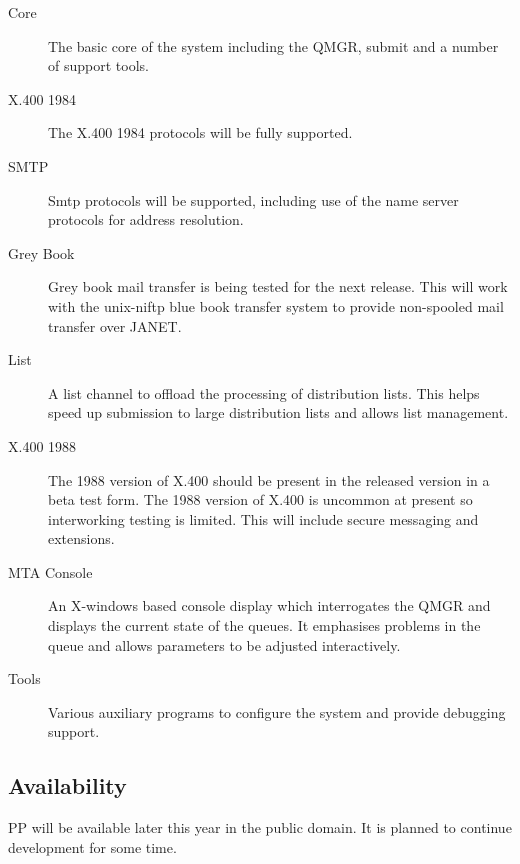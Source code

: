 \begin{description}
\item[Core]	The basic core of the system including the QMGR,
submit and a number of support tools.

\item[X.400 1984]	The X.400 1984 protocols will be fully supported.

\item[SMTP]	Smtp protocols will be supported, including use of the
name server protocols for address resolution.

\item[Grey Book] Grey book mail transfer is being tested for the next
release. This will work with the unix-niftp blue book transfer system
to provide non-spooled mail transfer over JANET.

\item[List]	A list channel to offload the processing of
distribution lists. This helps speed up submission to large
distribution lists and allows list management.

\item[X.400 1988]	The 1988 version of X.400 should be present in the
released version in a beta test form. The 1988 version of X.400 is
uncommon at present so interworking testing is limited. This will
include secure messaging and extensions.

\item[MTA Console]	An X-windows based console display which
interrogates the QMGR and displays the current state of the
queues. It emphasises problems in the queue and allows parameters to
be adjusted interactively.

\item[Tools]	Various auxiliary programs to configure the system and
provide debugging support.
 
\end{description}

\subsection{Availability}
PP will be available later this year in the public domain. It is
planned to continue development for some time.




\showsummary


